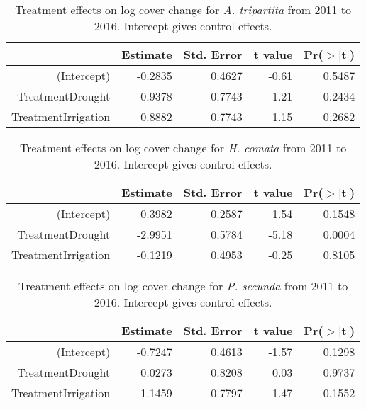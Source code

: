 \documentclass[11pt]{article}
\begin{document}
\begin{table}[ht]
	\centering
	\begin{tabular}{rrrrr}
		\hline
		& Estimate & Std. Error & t value & Pr($>$$|$t$|$) \\ 
		\hline
		(Intercept) & -0.2835 & 0.4627 & -0.61 & 0.5487 \\ 
		TreatmentDrought & 0.9378 & 0.7743 & 1.21 & 0.2434 \\ 
		TreatmentIrrigation & 0.8882 & 0.7743 & 1.15 & 0.2682 \\ 
		\hline
	\end{tabular}
	\caption{Treatment effects on log cover change for \textit{A. tripartita} from 2011 to 2016. Intercept gives control effects.} 
	\label{table:changeARTR}
\end{table}

\begin{table}[ht]
	\centering
	\begin{tabular}{rrrrr}
		\hline
		& Estimate & Std. Error & t value & Pr($>$$|$t$|$) \\ 
		\hline
		(Intercept) & 0.3982 & 0.2587 & 1.54 & 0.1548 \\ 
		TreatmentDrought & -2.9951 & 0.5784 & -5.18 & 0.0004 \\ 
		TreatmentIrrigation & -0.1219 & 0.4953 & -0.25 & 0.8105 \\ 
		\hline
	\end{tabular}
	\caption{Treatment effects on log cover change for \textit{H. comata} from 2011 to 2016. Intercept gives control effects.} 
	\label{table:changeHECO}
\end{table}

\begin{table}[ht]
	\centering
	\begin{tabular}{rrrrr}
		\hline
		& Estimate & Std. Error & t value & Pr($>$$|$t$|$) \\ 
		\hline
		(Intercept) & -0.7247 & 0.4613 & -1.57 & 0.1298 \\ 
		TreatmentDrought & 0.0273 & 0.8208 & 0.03 & 0.9737 \\ 
		TreatmentIrrigation & 1.1459 & 0.7797 & 1.47 & 0.1552 \\ 
		\hline
	\end{tabular}
	\caption{Treatment effects on log cover change for \textit{P. secunda} from 2011 to 2016. Intercept gives control effects.} 
	\label{table:changePOSE}
\end{table}
\end{document}
